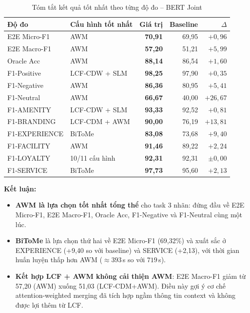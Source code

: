 \begin{table}[H]
\centering
\small
\caption{Tóm tắt kết quả tốt nhất theo từng độ đo -- BERT Joint}
\label{tab:best_model_summary}
\begin{tabular}{@{}llrrr@{}}
\toprule
\textbf{Độ đo} & \textbf{Cấu hình tốt nhất}
  & \textbf{Giá trị} & \textbf{Baseline} & $\Delta$ \\
\midrule
E2E Micro-F1      & AWM             & \textbf{70,91} & 69,95 & $+0,96$ \\
E2E Macro-F1      & AWM             & \textbf{57,20} & 51,21 & $+5,99$ \\
Oracle Acc        & AWM             & \textbf{88,14} & 86,54 & $+1,60$ \\
\midrule
F1-Positive       & LCF-CDW + SLM   & \textbf{98,25} & 97,90 & $+0,35$ \\
F1-Negative       & AWM             & \textbf{86,36} & 80,95 & $+5,41$ \\
F1-Neutral        & AWM             & \textbf{66,67} & 40,00 & $+26,67$ \\
\midrule
F1-AMENITY        & LCF-CDW + SLM   & \textbf{93,33} & 92,52 & $+0,81$ \\
F1-BRANDING       & LCF-CDM + AWM   & \textbf{90,00} & 76,19 & $+13,81$ \\
F1-EXPERIENCE     & BiToMe          & \textbf{83,08} & 73,68 & $+9,40$ \\
F1-FACILITY       & AWM             & \textbf{91,46} & 89,22 & $+2,24$ \\
F1-LOYALTY        & 10/11 cấu hình  & \textbf{92,31} & 92,31 & $\pm0,00$ \\
F1-SERVICE        & BiToMe          & \textbf{97,73} & 95,60 & $+2,13$ \\
\bottomrule
\end{tabular}
\end{table}

\textbf{Kết luận:}
\begin{itemize}
  \item \textbf{AWM là lựa chọn tốt nhất tổng thể} cho task 3 nhãn:
        đứng đầu về E2E Micro-F1, E2E Macro-F1, Oracle Acc,
        F1-Negative và F1-Neutral cùng một lúc.
  \item \textbf{BiToMe} là lựa chọn thứ hai về E2E Micro-F1 (69,32\%)
        và xuất sắc ở EXPERIENCE (+9,40 so với baseline) và SERVICE
        (+2,13), với thời gian huấn luyện thấp hơn AWM ($\approx393$\,s
        so với $719$\,s).
  \item \textbf{Kết hợp LCF + AWM không cải thiện AWM}: E2E Macro-F1
        giảm từ 57,20 (AWM) xuống 51,03 (LCF-CDM+AWM). Điều này gợi
        ý cơ chế attention-weighted merging đã tích hợp ngầm thông tin
        context và không được lợi thêm từ LCF.
\end{itemize}
